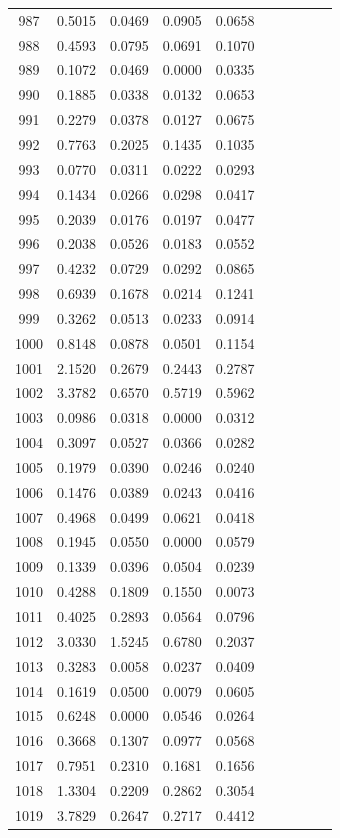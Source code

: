 \begin{table}
\begin{tabular}{cccccccccc}
987& 0.5015& 0.0469& 0.0905& 0.0658\\ 
988& 0.4593& 0.0795& 0.0691& 0.1070\\ 
989& 0.1072& 0.0469& 0.0000& 0.0335\\ 
990& 0.1885& 0.0338& 0.0132& 0.0653\\ 
991& 0.2279& 0.0378& 0.0127& 0.0675\\ 
992& 0.7763& 0.2025& 0.1435& 0.1035\\ 
993& 0.0770& 0.0311& 0.0222& 0.0293\\ 
994& 0.1434& 0.0266& 0.0298& 0.0417\\ 
995& 0.2039& 0.0176& 0.0197& 0.0477\\ 
996& 0.2038& 0.0526& 0.0183& 0.0552\\ 
997& 0.4232& 0.0729& 0.0292& 0.0865\\ 
998& 0.6939& 0.1678& 0.0214& 0.1241\\ 
999& 0.3262& 0.0513& 0.0233& 0.0914\\ 
1000& 0.8148& 0.0878& 0.0501& 0.1154\\ 
1001& 2.1520& 0.2679& 0.2443& 0.2787\\ 
1002& 3.3782& 0.6570& 0.5719& 0.5962\\ 
1003& 0.0986& 0.0318& 0.0000& 0.0312\\ 
1004& 0.3097& 0.0527& 0.0366& 0.0282\\ 
1005& 0.1979& 0.0390& 0.0246& 0.0240\\ 
1006& 0.1476& 0.0389& 0.0243& 0.0416\\ 
1007& 0.4968& 0.0499& 0.0621& 0.0418\\ 
1008& 0.1945& 0.0550& 0.0000& 0.0579\\ 
1009& 0.1339& 0.0396& 0.0504& 0.0239\\ 
1010& 0.4288& 0.1809& 0.1550& 0.0073\\ 
1011& 0.4025& 0.2893& 0.0564& 0.0796\\ 
1012& 3.0330& 1.5245& 0.6780& 0.2037\\ 
1013& 0.3283& 0.0058& 0.0237& 0.0409\\ 
1014& 0.1619& 0.0500& 0.0079& 0.0605\\ 
1015& 0.6248& 0.0000& 0.0546& 0.0264\\ 
1016& 0.3668& 0.1307& 0.0977& 0.0568\\ 
1017& 0.7951& 0.2310& 0.1681& 0.1656\\ 
1018& 1.3304& 0.2209& 0.2862& 0.3054\\ 
1019& 3.7829& 0.2647& 0.2717& 0.4412\\ 

\end{tabular}
\end{table}
